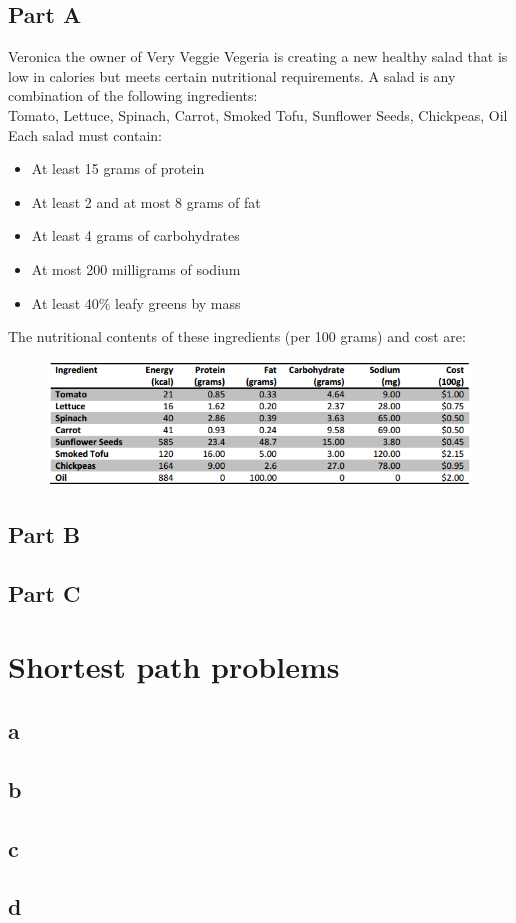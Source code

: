 \documentclass[11pt]{scrreprt}
\begin{document}
\section{Part A}
Veronica the owner of Very Veggie Vegeria is creating a new 
healthy salad that is low in calories but meets certain 
nutritional requirements. A salad is any combination of the 
following ingredients:\\

Tomato, Lettuce, Spinach, Carrot, Smoked Tofu, Sunflower Seeds, Chickpeas,
Oil\\

Each salad must contain:

\begin{itemize}
	\item At least 15 grams of protein
	\item At least 2 and at most 8 grams of fat
	\item At least 4 grams of carbohydrates
	\item At most 200 milligrams of sodium
	\item At least 40\% leafy greens by mass
\end{itemize}

The nutritional contents of these ingredients (per 100 grams)
and cost are:

\begin{figure}[!htbp]
	\includegraphics[width=1.0\textwidth]{nutritional.png}
\end{figure}

\section{Part B}
\section{Part C}

\chapter{Shortest path problems}

\section{a}
\section{b}
\section{c}
\section{d}
\end{document}
